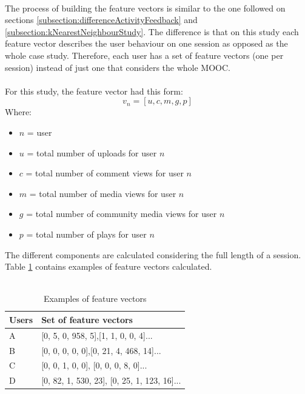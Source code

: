 \documentclass[11pt, oneside]{article}   	%
\begin{document}
\\The process of building the feature vectors is similar to the one followed on sections \ref{subsection:differenceActivityFeedback} and \ref{subsection:kNearestNeighbourStudy}. The difference is that on this study each feature vector describes the user behaviour on one session as opposed as the whole case study. Therefore, each user has a set of feature vectors (one per session) instead of just one that considers the whole MOOC.\\\\
For this study, the feature vector had this form:
\begin{equation}
v_n=[u,c,m,g,p]
\label{featureVector3}
\end{equation}
Where:
\begin{itemize}
	\item $n$ = user
	\item $u$ = total number of uploads for user $n$
	\item $c$ = total number of comment views for user $n$
	\item $m$ = total number of media views for user $n$
	\item $g$ = total number of community media views for user $n$
	\item $p$ = total number of plays for user $n$
\end{itemize}
The different components are calculated considering the full length of a session. Table \ref{table:featureVectorsKMeanss} contains examples of feature vectors calculated.\\\\
\begin{table}[h]
	\centering
	\begin{tabular}{| l | l |}
		\hline
		 \textbf{Users} & \textbf{Set of feature vectors} \\ \hline
		 A & [0, 5, 0, 958, 5],[1, 1, 0, 0, 4]... \\ \hline
		 B & [0, 0, 0, 0, 0],[0, 21, 4, 468, 14]... \\ \hline
		 C & [0, 0, 1, 0, 0], [0, 0, 0, 8, 0]... \\ \hline
		 D & [0, 82, 1, 530, 23], [0, 25, 1, 123, 16]...\\ \hline
	\end{tabular}
	\caption{Examples of feature vectors}
	\label{table:featureVectorsKMeanss}
\end{table}
\end{document}
